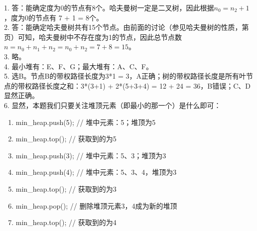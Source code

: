 %
%
    1. 答：能确定度为0的节点有8个。哈夫曼树一定是二叉树，因此根据$n_0=n_2+1$，度为0的节点有 7 + 1 = 8个。\\

    2. 答：能确定哈夫曼树共有15个节点。由前面的讨论（参见哈夫曼树的性质，第\pageref{minisec:哈夫曼树的性质}页）可知，哈夫曼树中不存在度为1的节点，因此总节点数
    $n = n_0 + n_1 + n_2 = n_0 + n_2 = 7 + 8 = 15$。\\

    3. 略。\\

    4. 最小堆有：E、F、G；最大堆有：A、C、F。\\

    5. 选B。节点B的带权路径长度为3*1 = 3，A正确；树的带权路径长度是所有叶节点的带权路径长度之和：3*(3+1) + 2*(5+3+4) = 12 + 24 = 36，B错误；C、D显然正确。\\

    6. 显然，本题我们只要关注堆顶元素（即最小的那一个）是什么即可：
    \begin{enumerate}[label=\arabic*）]
        \item min\_heap.push(5);  // 堆中元素：5；堆顶为5
        \item min\_heap.top();    // 获取到的为5
        \item min\_heap.push(3);  // 堆中元素：5、3；堆顶为3
        \item min\_heap.push(4);  // 堆中元素：5、3、4，堆顶为3
        \item min\_heap.top();    // 获取到的为3
        \item min\_heap.pop();    // 删除堆顶元素3，4成为新的堆顶
        \item min\_heap.top();    // 获取到的为4
    \end{enumerate}

    \vspace{\baselineskip}

